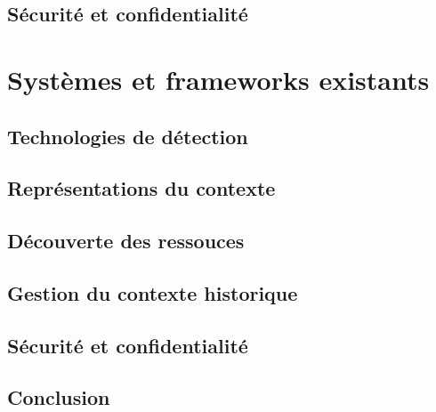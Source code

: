 \subsection{Sécurité et confidentialité}

\section{Systèmes et frameworks existants}

\subsection{Technologies de détection}

\subsection{Représentations du contexte}

\subsection{Découverte des ressouces}

\subsection{Gestion du contexte historique}

\subsection{Sécurité et confidentialité}

\subsection{Conclusion}


